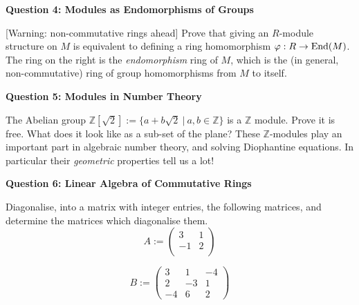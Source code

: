 \documentclass[11pt,twoside, a4paper]{report}
\theoremstyle{plain}
\theoremstyle{definition}
\begin{document}
\begin{center}
{\bf Question 4: Modules as Endomorphisms of Groups}
\end{center}

[Warning: non-commutative rings ahead] Prove that giving an $R$-module structure on $M$ is equivalent to defining a ring homomorphism $\varphi: R \rightarrow \textnormal{End}(M)$. The ring on the right is the \emph{endomorphism} ring of $M$, which is the (in general, non-commutative) ring of group homomorphisms from $M$ to itself. 

\begin{center}
{\bf Question 5: Modules in Number Theory}
\end{center}

The Abelian group $\mathbb{Z}[\sqrt{2}]:=\{ a + b \sqrt{2} \ | \ a,b \in \mathbb{Z}\}$ is a $\mathbb{Z}$ module. Prove it is free. What does it look like as a sub-set of the plane? These $\mathbb{Z}$-modules play an important part in algebraic number theory, and solving Diophantine equations. In particular their \emph{geometric} properties tell us a lot! 


\begin{center}
{\bf Question 6: Linear Algebra of Commutative Rings}
\end{center}

Diagonalise, into a matrix with integer entries, the following matrices, and determine the matrices which diagonalise them.
$$A:= \left( \begin{array}{cc}
3 & 1  \\
-1 & 2  \\
 \end{array} \right) $$
 
$$B:= \left( \begin{array}{ccc}
3 & 1 & -4 \\
2 & -3 & 1 \\
-4 & 6 & 2 \end{array} \right)$$
\end{document}
